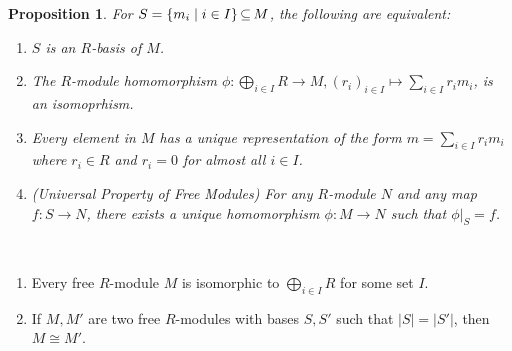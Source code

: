 \documentclass[11pt]{book}
\newcounter{counter}
\newtheorem{proposition}[counter]{Proposition}   \newtheorem{problem}[counter]{Problem}   \newtheorem*{proposition*}{Proposition}   \newtheorem*{lemma*}{Lemma}
\theoremstyle{definition}   \newtheorem{defn}[counter]{Definition} %
\DeclareMathOperator{\ra}{\rightarrow}   \DeclareMathOperator{\Poly}{\mathbf{P}}   \DeclareMathOperator{\spn}{\textnormal{span}}   \DeclareMathOperator{\aut}{\textnormal{Aut}}
\newcommand{\vs}{\vspace{8pt}}
\numberwithin{counter}{chapter}
\begin{document}
\begin{proposition}
For $S = \{m_i \mid i \in I\} \operatorname{\subseteq} M$, the following are equivalent:
\begin{enumerate}
\item[(i)] $S$ is an $R$-basis of $M$.
\item[(ii)] The $R$-module homomorphism $\phi : \bigoplus_{i \in I} R \ra M, (r_i)_{i \in I} \mapsto \sum_{i \in I} r_i m_i$, is an isomoprhism. 
\item[(iii)] Every element in $M$ has a unique representation of the form $m = \sum_{i \in I} r_i m_i$ where $r_i \in R$ and $r_i = 0$ for almost all $i \in I$.
\item[(iv)] (Universal Property of Free Modules) For any $R$-module $N$ and any map $f : S \ra N$, there exists a unique homomorphism $\phi : M \ra N$ such that $\phi|_S = f$. \quad 
{}
\end{enumerate}
\end{proposition}

\vs

\begin{corollary}\ 
\begin{enumerate}
\item[(a)] Every free $R$-module $M$ is isomorphic to $\bigoplus_{i \in I} R$ for some set $I$.
\item[(b)] If $M,M'$ are two free $R$-modules with bases $S,S'$ such that $|S| = |S'|$, then $M \cong M'$. 
\end{enumerate}
\end{corollary}

\vs
\end{document}
